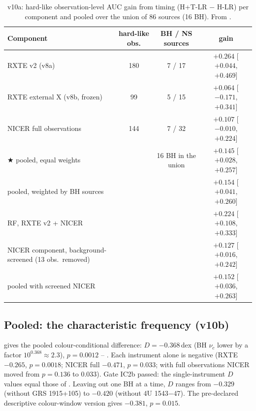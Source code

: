 \begin{table}[htbp]
\centering\small
\caption[Pooled hard-state timing gain]{\Primary{} v10a: hard-like observation-level AUC gain from timing (H+T-LR $-$ H-LR) per
component and pooled over the union of 86 sources (16 BH). From .}
\label{tab:p5v10a}
\footnotesize\setlength{\tabcolsep}{4pt}
\begin{tabular}{@{}>{\raggedright\arraybackslash}p{5.2cm}ccc@{}}
\toprule
Component & hard-like obs. & BH / NS sources & gain \\
\midrule
RXTE v2 (v8a) & 180 & 7 / 17 & $+0.264$ [$+0.044$, $+0.469$] \\
RXTE external X (v8b, frozen) & 99 & 5 / 15 & $+0.064$ [$-0.171$, $+0.341$] \\
NICER full observations & 144 & 7 / 32 & $+0.107$ [$-0.010$, $+0.224$] \\
\midrule
$\bigstar$ pooled, equal weights & & 16 BH in the union & $+0.145$ [$+0.028$, $+0.257$] \\
pooled, weighted by BH sources & & & $+0.154$ [$+0.041$, $+0.260$] \\
RF, RXTE v2 + NICER & & & $+0.224$ [$+0.108$, $+0.333$] \\
NICER component, background-screened (13 obs.\ removed) & & & $+0.127$ [$+0.016$, $+0.242$] \\
pooled with screened NICER & & & $+0.152$ [$+0.036$, $+0.263$] \\
\bottomrule
\end{tabular}
\end{table}

\subsection{Pooled: the characteristic frequency (v10b)}\label{sec:p5v10b}
\Primary{}  gives the pooled colour-conditional difference: $D=-0.368$\,dex (BH $\nu_c$ lower by a factor
$10^{0.368}\approx2.3$), $p=0.0012$ -- \Detected. Each instrument alone is negative (RXTE $-0.265$, $p=0.0018$; NICER full
$-0.471$, $p=0.033$; with full observations NICER moved from $p=0.136$ to 0.033). Gate IC2b passed: the single-instrument $D$
values equal those of . Leaving out one BH at a time, $D$ ranges from $-0.329$ (without GRS 1915+105) to
$-0.420$ (without 4U 1543$-$47). The pre-declared descriptive colour-window version gives $-0.381$, $p=0.015$.

